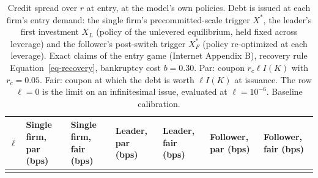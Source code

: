 \documentclass[
  11pt,
  letterpaper,
]{scrartcl}
\begin{document}
\begin{longtable}[]{@{}
  >{\raggedleft\arraybackslash}p{}
  >{\raggedleft\arraybackslash}p{}
  >{\raggedleft\arraybackslash}p{}
  >{\raggedleft\arraybackslash}p{}
  >{\raggedleft\arraybackslash}p{}
  >{\raggedleft\arraybackslash}p{}
  >{\raggedleft\arraybackslash}p{}@{}}
\caption{Credit spread over \(r\) at entry, at the model's own policies.
Debt is issued at each firm's entry demand: the single firm's
precommitted-scale trigger \(X^*\), the leader's first investment
\(X_L\) (policy of the unlevered equilibrium, held fixed across
leverage) and the follower's post-switch trigger \(X_F^*\) (policy
re-optimized at each leverage). Exact claims of the entry game (Internet
Appendix B), recovery rule Equation~\ref{eq-recovery}, bankruptcy cost
\(b = 0.30\). Par: coupon \(r_c \ell I(K)\) with \(r_c = 0.05\). Fair:
coupon at which the debt is worth \(\ell I(K)\) at issuance. The row
\(\ell = 0\) is the limit on an infinitesimal issue, evaluated at
\(\ell = 10^{-6}\). Baseline
calibration.}\label{tbl-credit-spread}\tabularnewline
\toprule\noalign{}
\begin{minipage}[b]{\linewidth}\raggedleft
\(\ell\)
\end{minipage} & \begin{minipage}[b]{\linewidth}\raggedleft
Single firm, par (bps)
\end{minipage} & \begin{minipage}[b]{\linewidth}\raggedleft
Single firm, fair (bps)
\end{minipage} & \begin{minipage}[b]{\linewidth}\raggedleft
Leader, par (bps)
\end{minipage} & \begin{minipage}[b]{\linewidth}\raggedleft
Leader, fair (bps)
\end{minipage} & \begin{minipage}[b]{\linewidth}\raggedleft
Follower, par (bps)
\end{minipage} & \begin{minipage}[b]{\linewidth}\raggedleft
Follower, fair (bps)
\end{minipage} \\
\midrule\noalign{}
\endfirsthead
\toprule\noalign{}

\end{longtable}
\end{document}
